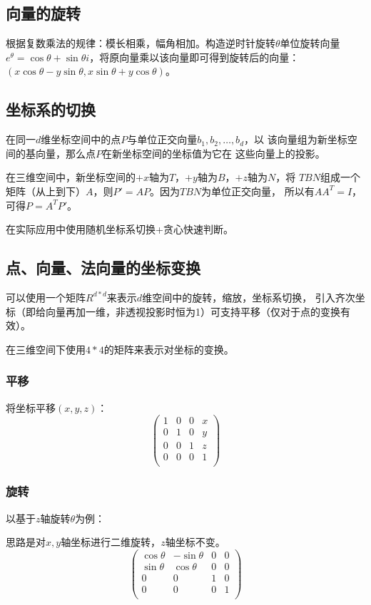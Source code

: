 \subsection{向量的旋转}
根据复数乘法的规律：模长相乘，幅角相加。构造逆时针旋转$\theta$单位旋转向量
$e^\theta=\cos \theta+\sin \theta i$，将原向量乘以该向量即可得到旋转后的向量：
$(x\cos \theta-y\sin \theta,x\sin \theta+y\cos \theta)$。
\subsection{坐标系的切换}
在同一$d$维坐标空间中的点$P$与单位正交向量$b_1,b_2,\ldots,b_d$，以
该向量组为新坐标空间的基向量，那么点$P$在新坐标空间的坐标值为它在
这些向量上的投影。

在三维空间中，新坐标空间的$+x$轴为$T$，$+y$轴为$B$，$+z$轴为$N$，将
$TBN$组成一个矩阵（从上到下）$A$，则$P'=AP$。因为$TBN$为单位正交向量，
所以有$AA^T=I$，可得$P=A^TP'$。

在实际应用中使用随机坐标系切换+贪心快速判断。
\subsection{点、向量、法向量的坐标变换}
可以使用一个矩阵$R^{d*d}$来表示$d$维空间中的旋转，缩放，坐标系切换，
引入齐次坐标（即给向量再加一维，非透视投影时恒为1）可支持平移（仅对于点的变换有效）。

在三维空间下使用$4*4$的矩阵来表示对坐标的变换。

\subsubsection{平移}
将坐标平移$(x,y,z)$：
\begin{displaymath}
	\left(\begin{array}{cccc}
		1 & 0 & 0 & x \\
		0 & 1 & 0 & y \\
		0 & 0 & 1 & z \\
		0 & 0 & 0 & 1 \\
	\end{array}\right)
\end{displaymath}
\subsubsection{旋转}
以基于$z$轴旋转$\theta$为例：

思路是对$x,y$轴坐标进行二维旋转，$z$轴坐标不变。
\begin{displaymath}
	\left(\begin{array}{cccc}
		\cos \theta & -\sin \theta & 0 & 0 \\
		\sin \theta & \cos \theta  & 0 & 0 \\
		0           & 0            & 1 & 0 \\
		0           & 0            & 0 & 1 \\
	\end{array}\right)
\end{displaymath}
